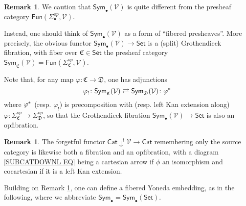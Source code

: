 \documentclass[a4paper,10pt
]{article}%
\numberwithin{equation}{section}
\numberwithin{figure}{section}
\theoremstyle{definition} %
\newtheorem{remark}[equation]{Remark}%
\newcommand{\Sym}{\ensuremath{\mathsf{Sym}}}%
\newcommand{\V}{\ensuremath{\mathcal V}}
\newcommand{\1}{\ensuremath{\mathbbm 1}}%
\begin{document}
\begin{remark}\label{COLCHADJ REM}
	We caution that 
	$\mathsf{Sym}_{\bullet}(\V)$
	is quite different from the presheaf category 
	$\mathsf{Fun}(\Sigma_{\bullet}^{op},\V)$.

	Instead, one should think of 
	$\mathsf{Sym}_{\bullet}(\V)$
	as a form of ``fibered presheaves''.
	More precisely,
        the obvious functor
        $\mathsf{Sym}_{\bullet}(\V) \to \mathsf{Set}$
        is a (split) Grothendieck fibration,
	with fiber over 
	$\mathfrak{C} \in \mathsf{Set}$
	the presheaf category
	$\Sym_{\mathfrak C}(\V)=
	\mathsf{Fun}(\Sigma_{\mathfrak{C}}^{op},\mathcal{V})$.

	Note that,
	for any map $\varphi \colon \mathfrak{C} \to \mathfrak{D}$,
	one has adjunctions
	\begin{equation}\label{COLCHADJ EQ}
	\varphi_! \colon \Sym_{\mathfrak C}(\V) 
	\rightleftarrows 
	\Sym_{\mathfrak D}(\V) \colon \varphi^{\**}
	\end{equation}
	where $\varphi^{\**}$
	(resp. $\varphi_!$)
	is precomposition with (resp. left Kan extension along)
	$\varphi\colon 
	\Sigma^{op}_{\mathfrak{C}}
	\to 
	\Sigma^{op}_{\mathfrak{D}}$,
	so that the Grothendieck fibration
	$\mathsf{Sym}_{\bullet}(\V) \to \mathsf{Set}$
	is also an opfibration. 
\end{remark}


\begin{remark}\label{SUBCOCART REM}
	The forgetful functor $\mathsf{Cat} \downarrow^l \mathcal{V} \to \mathsf{Cat}$
	remembering only the source category is likewise both a fibration and an opfibration, 
	with a diagram \eqref{SUBCATDOWNL EQ}
	being a cartesian arrow if  $\phi$ an isomorphism
	and cocartesian if it is a left Kan extension. 
\end{remark}


Building on Remark \ref{COLCHADJ REM},
one can define a fibered Yoneda embedding, as in the following,
where we abbreviate
$\mathsf{Sym}_{\bullet} = \mathsf{Sym}_{\bullet}(\mathsf{Set})$.
\end{document}
